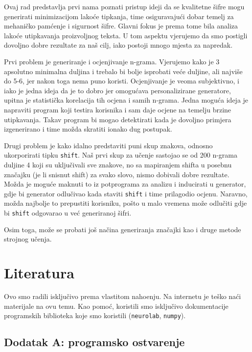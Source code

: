 \documentclass[a4paper,twocolumn]{article}
\begin{document}
Ovaj rad predstavlja prvi nama poznati pristup ideji da se kvalitetne \v{s}ifre
mogu generirati minimizacijom lako\'ce tipkanja, time osiguravaju\'ci dobar
temelj za mehani\v{c}ko pam\'cenje i sigurnost \v{s}ifre. Glavni fokus je prema
tome bila analiza lako\'ce utipkavanja proizvoljnog teksta. U tom aspektu
vjerujemo da smo postigli dovoljno dobre rezultate za na\v{s} cilj, iako
postoji mnogo mjesta za napredak.

Prvi problem je generiranje i ocjenjivanje n-grama. Vjerujemo kako je 3
apsolutno minimalna duljina i trebalo bi bolje isprobati ve\'ce duljine, ali
najvi\v{s}e do 5-6, jer nakon toga nema puno koristi. Ocjenjivanje je veoma
subjektivno, i iako je jedna ideja da je to dobro jer omogu\'cava
personalizirane generatore, upitna je statisti\v{c}ka korelacija tih ocjena i
samih n-grama. Jedna mogu\'ca ideja je napraviti program koji testira korisnika
i sam daje ocjene na temelju brzine utipkavanja. Takav program bi mogao
detektirati kada je dovoljno primjera izgenerirano i time mo\v{z}da skratiti
ionako dug postupak.

Drugi problem je kako idalno predstaviti puni skup znakova, odnosno
ukorporirati tipku \texttt{shift}. Na\v{s} prvi skup za u\v{c}enje sastojao se
od 200 n-grama duljine 4 koji su uklju\v{c}ivali sve znakove, no sa mapiranjem
shifta u posebnu zna\v{c}ajku (je li snisnut shift) za svako slovo, nismo
dobivali dobre rezultate. Mo\v{z}da je mogu\'ce maknuti to iz potprograma za
analizu i inducirati u generator, gdje bi generator odlu\v{c}ivao kada staviti
\texttt{shift} i time prilagodio ocjenu. Naravno, mo\v{z}da najbolje to
prepustiti korisniku, po\v{s}to u malo vremena mo\v{z}e odlu\v{c}iti gdje bi
\texttt{shift} odgovarao u ve\'c generiranoj \v{s}ifri.

Osim toga, mo\v{z}e se probati jo\v{s} na\v{c}ina generiranja zna\v{c}ajki kao
i druge metode strojnog u\v{c}enja.

\section*{Literatura}

Ovo smo radili isklju\v{c}ivo prema vlastitom naho\dj enju. Na internetu
je te\v{s}ko na\'ci materijale na ovu temu. Kao pomo\'c, koristili smo
isklju\v{c}ivo dokumentacije programskih biblioteka koje smo koristili
(\texttt{neurolab}, \texttt{numpy}).

\subsection*{Dodatak A: programsko ostvarenje}
\end{document}
